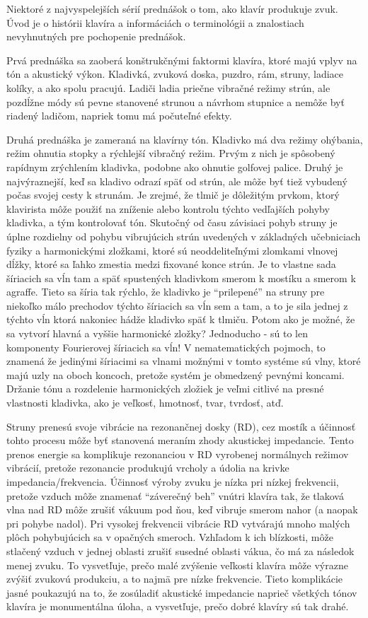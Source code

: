 Niektoré z najvyspelejších sérií prednášok o tom, ako klavír produkuje zvuk. Úvod je o histórii klavíra a informáciách o terminológii a znalostiach nevyhnutných pre pochopenie prednášok. 

Prvá prednáška sa zaoberá konštrukčnými faktormi klavíra, ktoré majú vplyv na tón a akustický výkon. Kladivká, zvuková doska, puzdro, rám, struny, ladiace kolíky, a ako spolu pracujú. Ladiči ladia priečne vibračné režimy strún, ale pozdĺžne módy sú pevne stanovené strunou a návrhom stupnice a nemôže byť riadený ladičom, napriek tomu má počuteľné efekty. 

Druhá prednáška je zameraná na klavírny tón. Kladivko má dva režimy ohýbania, režim ohnutia stopky a rýchlejší vibračný režim. Prvým z nich je spôsobený rapídnym zrýchlením kladivka, podobne ako ohnutie golfovej palice. Druhý je najvýraznejší, keď sa kladivo odrazí späť od strún, ale môže byť tiež vybudený počas svojej cesty k strunám. Je zrejmé, že tlmič je dôležitým prvkom, ktorý klavirista môže použiť na zníženie alebo kontrolu týchto vedľajších pohyby kladivka, a tým kontrolovať tón. Skutočný od času závisiaci pohyb struny je úplne rozdielny od pohybu vibrujúcich strún uvedených v základných učebniciach fyziky a harmonickými zložkami, ktoré sú neoddeliteľnými zlomkami vlnovej dĺžky, ktoré sa ľahko zmestia medzi fixované konce strún. Je to vlastne sada šíriacich sa vĺn tam a späť spustených kladivkom smerom k mostíku a smerom k agraffe. Tieto sa šíria tak rýchlo, že kladivko je “prilepené” na struny pre niekoľko málo prechodov týchto šíriacich sa vĺn sem a tam, a to je sila jednej z týchto vĺn ktorá nakoniec hádže kladivko späť k tlmiču. Potom ako je možné, že sa vytvorí hlavná a vyššie harmonické zložky? Jednoducho - sú to len komponenty Fourierovej šíriacich sa vĺn! V nematematických pojmoch, to znamená že jedinými šíriacimi sa vlnami možnými v tomto systéme sú vlny, ktoré majú uzly na oboch koncoch, pretože systém je obmedzený pevnými koncami. Držanie tónu a rozdelenie harmonických zložiek je veľmi citlivé na presné vlastnosti kladivka, ako je veľkosť, hmotnosť, tvar, tvrdosť, atď. 

Struny prenesú svoje vibrácie na rezonančnej dosky (RD), cez mostík a účinnosť tohto procesu môže byť stanovená meraním zhody akustickej impedancie. Tento prenos energie sa komplikuje rezonanciou v RD vyrobenej normálnych režimov vibrácií, pretože rezonancie produkujú vrcholy a údolia na krivke impedancia/frekvencia. Účinnosť výroby zvuku je nízka pri nízkej frekvencii, pretože vzduch môže znamenať “záverečný beh” vnútri klavíra tak, že tlaková vlna nad RD môže zrušiť vákuum pod ňou, keď vibruje smerom nahor (a naopak pri pohybe nadol). Pri vysokej frekvencii vibrácie RD vytvárajú mnoho malých plôch pohybujúcich sa v opačných smeroch. Vzhľadom k ich blízkosti, môže stlačený vzduch v jednej oblasti zrušiť susedné oblasti vákua, čo má za následok menej zvuku. To vysvetľuje, prečo malé zvýšenie veľkosti klavíra môže výrazne zvýšiť zvukovú produkciu, a to najmä pre nízke frekvencie. Tieto komplikácie jasné poukazujú na to, že zosúladiť akustické impedancie naprieč všetkých tónov klavíra je monumentálna úloha, a vysvetľuje, prečo dobré klavíry sú tak drahé. 

